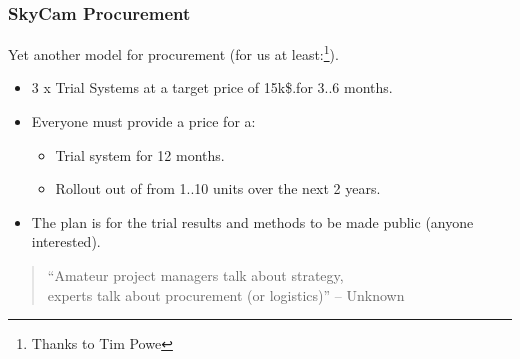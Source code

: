 \documentclass{beamer}
\begin{document}
\begin{frame}\frametitle{SkyCam Procurement}
Yet another model for procurement (for us at least:\footnote{Thanks to Tim Powe}).
  \begin{itemize}
  \item 3 x Trial Systems at a target price of 15k\$.for 3..6 months.
    \pause
  \item Everyone must provide a price for a:
    \begin{itemize}
    \item Trial system for 12 months.
    \item Rollout out of from 1..10 units over the next 2 years.
    \end{itemize}
  \item The plan is for the trial results and methods to be made
    public (anyone interested).
  \end{itemize}
\vfill
  \begin{quote}
    ``Amateur project managers talk about strategy, \\
    experts talk about procurement (or logistics)'' -- Unknown
  \end{quote}
\end{frame}
\end{document}
